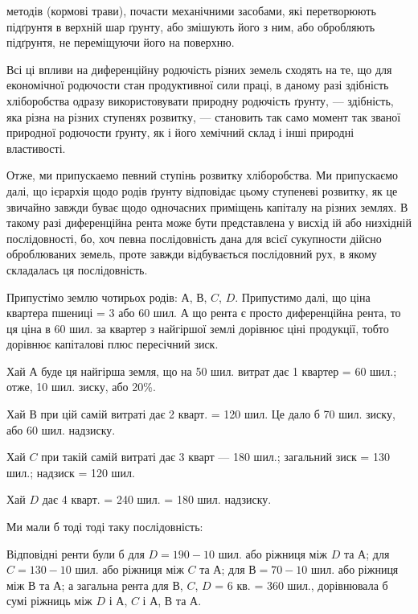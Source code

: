\parcont{}  %
методів (кормові трави), почасти механічними засобами, які перетворюють
підґрунтя в верхній шар ґрунту, або змішують його з ним, або обробляють підґрунтя,
не переміщуючи його на поверхню.

Всі ці впливи на диференційну родючість різних земель сходять на те, що для
економічної родючости стан продуктивної сили праці, в даному разі здібність хліборобства
одразу використовувати природну родючість ґрунту, — здібність, яка різна
на різних ступенях розвитку, — становить так само момент так званої природної
родючости ґрунту, як і його хемічний склад і інші природні властивості.

Отже, ми припускаемо певний ступінь розвитку хліборобства. Ми припускаємо
далі, що ієрархія щодо родів ґрунту відповідає цьому ступеневі розвитку,
як це звичайно завжди буває щодо одночасних приміщень капіталу на різних
землях. В такому разі диференційна рента може бути представлена у висхід ій
або низхідній послідовності, бо, хоч певна послідовність дана для всієї сукупности
дійсно оброблюваних земель, проте завжди відбувається послідовний рух,
в якому складалась ця послідовність.

Припустімо землю чотирьох родів: $А$, $В$, $C$, $D$. Припустимо далі, що ціна
квартера пшениці = 3 або 60 шил. А що рента є просто диференційна рента,
то ця ціна в 60 шил. за квартер з найгіршої землі дорівнює ціні продукції,
тобто дорівнює капіталові плюс пересічний зиск.

Хай $А$ буде ця найгірша земля, що на 50 шил. витрат дає 1 квартер = 60
шил.; отже, 10 шил. зиску, або 20\%.

Хай $В$ при цій самій витраті дає 2 кварт. = 120 шил. Це дало б 70 шил.
зиску, або 60 шил. надзиску.

Хай $C$ при такій самій витраті дає 3 кварт — 180 шил.; загальний
зиск = 130 шил.; надзиск = 120 шил.

Хай $D$ дає 4 кварт. = 240 шил. = 180 шил. надзиску.

Ми мали б тоді тоді таку послідовність:

Відповідні ренти були б для $D = 190 - 10$ шил. або ріжниця між $D$ та
$А$; для $C = 130 - 10$ шил. або ріжниця між $C$ та $А$; для $В = 70 - 10$ шил. або ріжниця
між $В$ та $А$; а загальна рента для $В$, $C$, $D$ = 6 кв. = 360 шил., дорівнювала б сумі ріжниць між
$D$ і $А$, $C$ і $А$, $В$ та $А$.

